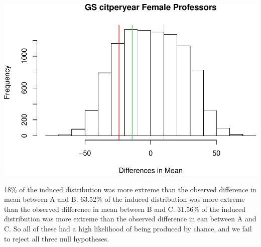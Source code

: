 \documentclass[]{article}
\newenvironment{Shaded}{\begin{snugshade}}{\end{snugshade}}
\newcommand{\DataTypeTok}[1]{\textcolor[rgb]{0.13,0.29,0.53}{#1}}
\newcommand{\DecValTok}[1]{\textcolor[rgb]{0.00,0.00,0.81}{#1}}
\newcommand{\KeywordTok}[1]{\textcolor[rgb]{0.13,0.29,0.53}{\textbf{#1}}}
\newcommand{\NormalTok}[1]{#1}
\newcommand{\OperatorTok}[1]{\textcolor[rgb]{0.81,0.36,0.00}{\textbf{#1}}}
\newcommand{\StringTok}[1]{\textcolor[rgb]{0.31,0.60,0.02}{#1}}
\begin{document}
\begin{Shaded}
\end{Shaded}

\includegraphics{final_files/figure-latex/unnamed-chunk-73-1.pdf}

18\% of the induced distribution was more extreme than the observed
difference in mean between A and B. 63.52\% of the induced distribution
was more extreme than the observed difference in mean between B and C.
31.56\% of the induced distribution was more extreme than the observed
difference in ean between A and C. So all of these had a high likelihood
of being produced by chance, and we fail to reject all three null
hypotheses.
\end{document}
